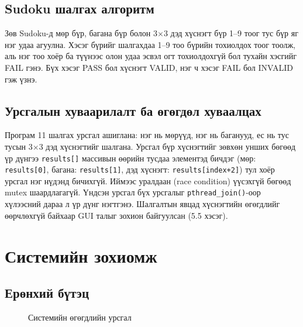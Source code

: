 \documentclass[12pt,a4paper]{report}
\begin{document}
\section{Sudoku шалгах алгоритм}
Зөв Sudoku-д мөр бүр, багана бүр болон 3$\times$3 дэд хүснэгт бүр 1--9 тоог тус бүр яг нэг удаа агуулна. Хэсэг бүрийг шалгахдаа 1--9 тоо бүрийн тохиолдох тоог тоолж, аль нэг тоо хоёр ба түүнээс олон удаа эсвэл огт тохиолдохгүй бол тухайн хэсгийг FAIL гэнэ. Бүх хэсэг PASS бол хүснэгт VALID, нэг ч хэсэг FAIL бол INVALID гэж үзнэ.
\section{Урсгалын хуваарилалт ба өгөгдөл хуваалцах}
Програм 11 шалгах урсгал ашиглана: нэг нь мөрүүд, нэг нь баганууд, ес нь тус тусын 3$\times$3 дэд хүснэгтийг шалгана. Урсгал бүр хүснэгтийг зөвхөн унших бөгөөд үр дүнгээ \texttt{results[]} массивын өөрийн тусдаа элементэд бичдэг (мөр: \texttt{results[0]}, багана: \texttt{results[1]}, дэд хүснэгт: \texttt{results[index+2]}) тул хоёр урсгал нэг нүдэнд бичихгүй. Иймээс уралдаан (race condition) үүсэхгүй бөгөөд mutex шаардлагагүй. Үндсэн урсгал бүх урсгалыг \texttt{pthread\_join()}-оор хүлээсний дараа л үр дүнг нэгтгэнэ. Шалгалтын явцад хүснэгтийн өгөгдлийг өөрчлөхгүй байхаар GUI талыг зохион байгуулсан (5.5 хэсэг).

\chapter{Системийн зохиомж}
\section{Ерөнхий бүтэц}
\begin{figure}[H]\centering{}\caption{Системийн өгөгдлийн урсгал}\end{figure}
\end{document}
